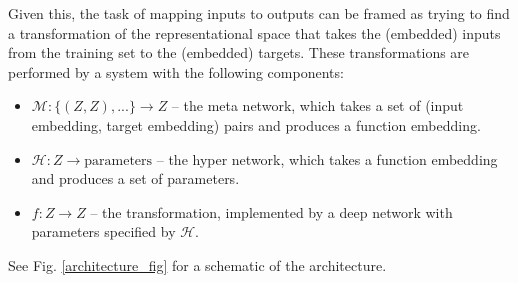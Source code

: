 \documentclass[11pt]{article}
\begin{document}
Given this, the task of mapping inputs to outputs can be framed as trying to find a transformation of the representational space that takes the (embedded) inputs from the training set to the (embedded) targets. These transformations are performed by a system with the following components:  
\begin{itemize}
\item $\mathcal{M}: \{(Z, Z), ...\} \rightarrow Z $ -- the meta network, which takes a set of (input embedding, target embedding) pairs and produces a function embedding. 
\item $\mathcal{H}: Z \rightarrow \text{parameters}$ -- the hyper network, which takes a function embedding and produces a set of parameters. 
\item $f: Z \rightarrow Z$ -- the transformation, implemented by a deep network with parameters specified by $\mathcal{H}$.
\end{itemize}
See Fig. \ref{architecture_fig} for a schematic of the architecture. \par 
\end{document}
